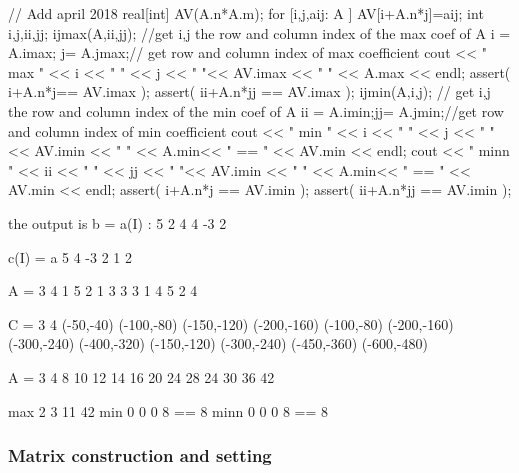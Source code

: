 \documentclass[a4paper,twoside,12pt]{book}
\def\setS#1{#1\label{sec:#1}}
\begin{document}
//  Add april 2018
   real[int] AV(A.n*A.m);
   for [i,j,aij: A ] AV[i+A.n*j]=aij;
     int i,j,ii,jj;
    ijmax(A,ii,jj); //get i,j the  row and column index  of the max coef of A 
    i = A.imax;	j=  A.jmax;// get row and column index of max coefficient 
    cout << " max " << i << " " << j << " "<< AV.imax << " " << A.max << endl; 
    assert( i+A.n*j== AV.imax );
    assert( ii+A.n*jj == AV.imax );
    ijmin(A,i,j); //  get i,j the  row and column index  of the min coef of A  
    ii = A.imin;jj=  A.jmin;//get row and column index of min coefficient 
    cout << " min  " << i << " " << j << " "<< AV.imin << " " 
         << A.min<< " == " << AV.min << endl; 
    cout << " minn " << ii << " " << jj << " "<< AV.imin 
         << " " << A.min<< " == " << AV.min << endl; 
    assert( i+A.n*j == AV.imin  );
    assert( ii+A.n*jj == AV.imin  );

\eFF

 the output is
 \bFF
 b = a(I) : 5
          2       4       4      -3       2

  c(I) = a 5
          4      -3       2       1       2

 A = 3 4
           1   5   2   1
           3   3   3   1
           4   5   2   4

 C = 3 4
         (-50,-40) (-100,-80) (-150,-120) (-200,-160)
         (-100,-80) (-200,-160) (-300,-240) (-400,-320)
         (-150,-120) (-300,-240) (-450,-360) (-600,-480)

 A = 3 4
           8  10  12  14
          16  20  24  28
          24  30  36  42
          
 max 2 3 11 42
 min  0 0 0 8 == 8
 minn 0 0 0 8 == 8
          
\eFF

\subsubsection{\setS{Matrix  construction and setting}}
\end{document}
